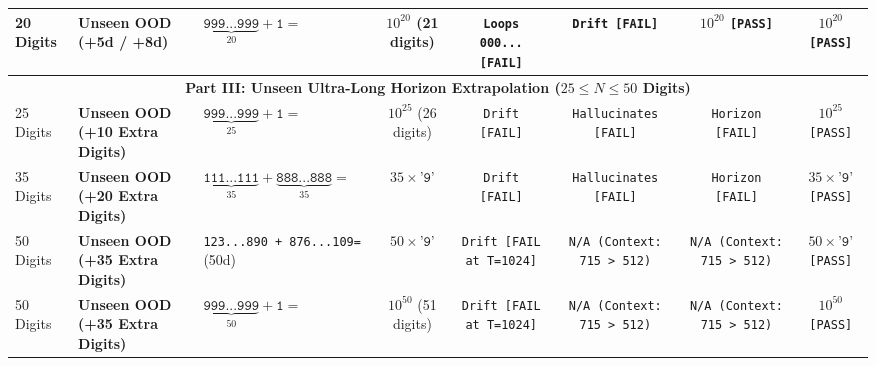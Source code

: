 \documentclass[10pt,twocolumn]{article}
\begin{document}
\begin{table}[t]
{\begin{tabular}{@{}lllccccc@{}}
20 Digits & \textbf{Unseen OOD (+5d / +8d)} & $\underbrace{\texttt{999...999}}_{20} + \texttt{1}=$ & $10^{20}$ (21 digits) & \texttt{Loops 000... [FAIL]} & \texttt{Drift [FAIL]} & $10^{20}$ \texttt{[PASS]} & $10^{20}$ \texttt{[PASS]} \\
\midrule
\multicolumn{8}{c}{\textbf{Part III: Unseen Ultra-Long Horizon Extrapolation ($25 \le N \le 50$ Digits)}} \\
\midrule
25 Digits & \textbf{Unseen OOD (+10 Extra Digits)} & $\underbrace{\texttt{999...999}}_{25} + \texttt{1}=$ & $10^{25}$ (26 digits) & \texttt{Drift [FAIL]} & \texttt{Hallucinates [FAIL]} & \texttt{Horizon [FAIL]} & $10^{25}$ \texttt{[PASS]} \\
35 Digits & \textbf{Unseen OOD (+20 Extra Digits)} & $\underbrace{\texttt{111...111}}_{35} + \underbrace{\texttt{888...888}}_{35}=$ & $35\times\texttt{'9'}$ & \texttt{Drift [FAIL]} & \texttt{Hallucinates [FAIL]} & \texttt{Horizon [FAIL]} & $35\times\texttt{'9'}$ \texttt{[PASS]} \\
50 Digits & \textbf{Unseen OOD (+35 Extra Digits)} & \texttt{123...890 + 876...109=} (50d) & $50\times\texttt{'9'}$ & \texttt{Drift [FAIL at T=1024]} & \texttt{N/A (Context: 715 > 512)} & \texttt{N/A (Context: 715 > 512)} & $50\times\texttt{'9'}$ \texttt{[PASS]} \\
50 Digits & \textbf{Unseen OOD (+35 Extra Digits)} & $\underbrace{\texttt{999...999}}_{50} + \texttt{1}=$ & $10^{50}$ (51 digits) & \texttt{Drift [FAIL at T=1024]} & \texttt{N/A (Context: 715 > 512)} & \texttt{N/A (Context: 715 > 512)} & $10^{50}$ \texttt{[PASS]} \\
\bottomrule
\end{tabular}%
}
\end{table}
\end{document}
